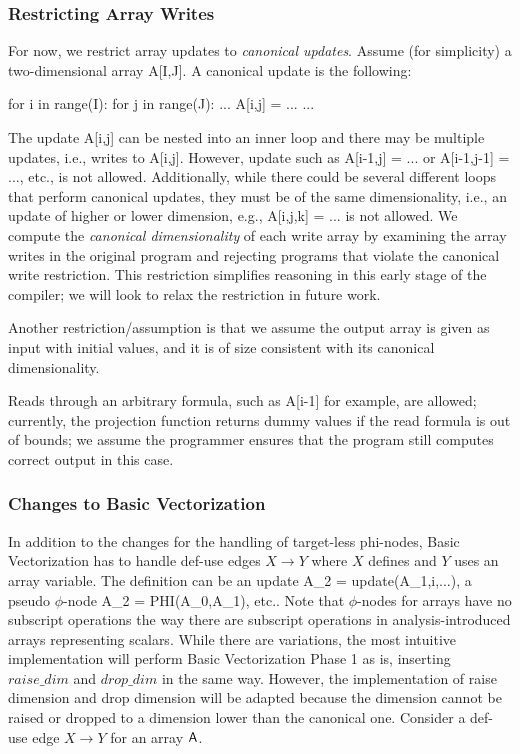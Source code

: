 \subsubsection{Restricting Array Writes}

For now, we restrict array updates to \emph{canonical updates}. Assume (for simplicity) a two-dimensional array {\sf A[I,J]}. A canonical update is the following:
\begin{pythonn}
for i in range(I):
  for j in range(J):
    ...
    A[i,j] = ...
    ...
\end{pythonn}

The update {\sf A[i,j]} can be nested into an inner loop and there may be multiple updates, i.e., writes to {\sf A[i,j]}. However, update such as {\sf A[i-1,j] = ...} or {\sf A[i-1,j-1] = ...}, etc., is not allowed. Additionally, while there could be several different loops that perform canonical updates, they must be of the same dimensionality, i.e., an update of higher or lower dimension, e.g., {\sf A[i,j,k] = ...} is not allowed. We compute the \emph{canonical dimensionality} of each write array by examining the array writes in the original program and rejecting programs that violate the canonical write restriction. This restriction simplifies reasoning in this early stage of the compiler; we will look to relax the restriction in future work.

Another restriction/assumption is that we assume the output array is given as input with initial values, and it is of size consistent with its canonical dimensionality.

Reads through an arbitrary formula, such as {\sf A[i-1]} for example, are allowed; currently, the projection function returns dummy values if the read formula is out of bounds; we assume the programmer ensures that the program still computes correct output in this case.

\subsubsection{Changes to Basic Vectorization}

In addition to the changes for the handling of target-less phi-nodes, Basic Vectorization has to handle def-use edges $X \rightarrow Y$ where $X$ defines and $Y$ uses an array variable. The definition can be an update {\sf A\_2 = update(A\_1,i,...)}, a pseudo $\phi$-node {\sf A\_2 = PHI(A\_0,A\_1)}, etc.. Note that $\phi$-nodes for arrays have no subscript operations the way there are subscript operations in analysis-introduced arrays representing scalars. While there are variations, the most intuitive implementation will perform Basic Vectorization Phase 1 as is, inserting
$\mathit{raise\_dim}$ and $\mathit{drop\_dim}$ in the same way. However, the implementation of raise dimension and drop dimension will be adapted because the dimension cannot be raised or dropped to a dimension lower than the canonical one. Consider a def-use edge $X \rightarrow Y$ for an array ${\sf A}$.

